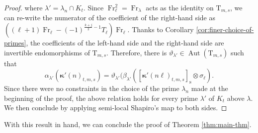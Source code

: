 \documentclass[12pt,reqno]{amsart}
\theoremstyle{definition}
\theoremstyle{remark}
\newcommand{\T}{\boldsymbol{\mathrm{T}}}
\DeclareMathOperator{\Aut}{Aut}
\DeclareMathOperator{\Fr}{Fr}
\newcommand{\s}{\mathrm{s}}
\newcommand{\ga}{\alpha}
\newcommand{\gk}{\kappa}
\newcommand{\gl}{\lambda}
\begin{document}
\begin{proof}
    where $\gl'=\gl_n\cap K_t$. Since $\Fr_\ell^2=\Fr_\gl$ acts as the identity on $\T_{m,s}$, we can re-write the numerator of the coefficient of the right-hand side as $((\ell+1)\Fr_\ell-(-1)^{\frac{k+j}{2}-1}T_\ell)\Fr_\ell$. Thanks to Corollary \ref{cor:finer-choice-of-primes}, the coefficients of the left-hand side and the right-hand side are invertible endomorphisms of $\T_{m,s}$. Therefore, there is $\vartheta_{\gl'}\in\Aut(\T_{m,s})$ such that 
    \begin{equation*}
        \ga_{\gl'}(\boldsymbol{\gk}'(n)_{t,m,s})=\vartheta_{\gl'}(\beta_{\gl'}([\boldsymbol{\gk}'(n\ell)_{t,m,s}]_{\s}\otimes\sigma_\ell).
    \end{equation*}
    Since there were no constraints in the choice of the prime $\gl_n$ made at the beginning of the proof, the above relation holds for every prime $\gl'$ of $K_t$ above $\gl$. We then conclude by applying semi-local Shapiro's map to both sides.
\end{proof}

With this result in hand, we can conclude the proof of Theorem \ref{thm:main-thm}.
\end{document}
